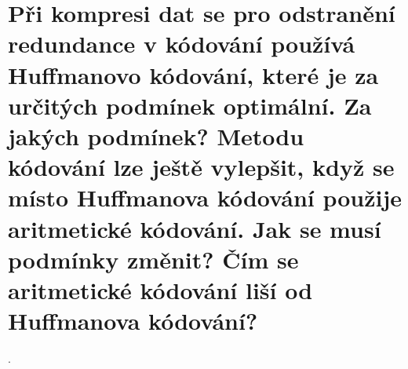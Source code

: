\section{Při kompresi dat se pro odstranění redundance v kódování používá Huffmanovo kódování, které je za určitých 
podmínek optimální. Za jakých podmínek? Metodu kódování lze ještě vylepšit, když se místo Huffmanova kódování použije 
aritmetické kódování. Jak se musí podmínky změnit? Čím se aritmetické kódování liší od Huffmanova kódování?}.